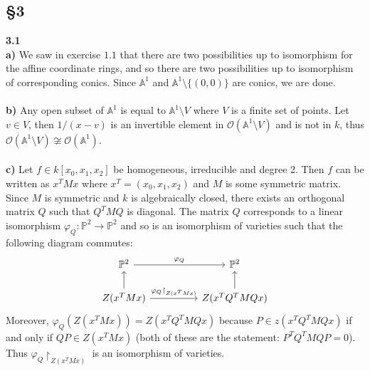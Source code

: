 \documentclass[12pt]{article}
\numberwithin{thm}{subsection}
\numberwithin{defn}{subsection}
\numberwithin{lemma}{subsection}
\numberwithin{example}{subsection}
\numberwithin{notation}{subsection}
\numberwithin{cor}{subsection}
\numberwithin{remark}{subsection}
\numberwithin{condition}{subsection}
\numberwithin{question}{subsection}
\numberwithin{construction}{subsection}
\numberwithin{construction}{subsection}
\numberwithin{construction}{subsection}
\newcommand{\bb}[1]{\mathbb{#1}}
\newcommand{\call}[1]{\mathcal{#1}}
\newcommand{\lto}{\longrightarrow}
\begin{document}
\subsection{\S 3}
\textbf{3.1}\\
\textbf{a)} We saw in exercise $1.1$ that there are two possibilities up to isomorphism for the affine coordinate rings, and so there are two possibilities up to isomorphism of corresponding conics. Since $\bb{A}^1$ and $\bb{A}^1\setminus \lbrace (0,0)\rbrace$ are conics, we are done.\\\\
%
\textbf{b)} Any open subset of $\bb{A}^1$ is equal to $\bb{A}^1\setminus V$ where $V$ is a finite set of points. Let $v \in V$, then $1/(x-v)$ is an invertible element in $\call{O}(\bb{A}^1\setminus V)$ and is not in $k$, thus $\call{O}(\bb{A}^1\setminus V) \not\cong \call{O}(\bb{A}^1)$.\\\\
%
\textbf{c)} Let $f \in k[x_0,x_1,x_2]$ be homogeneous, irreducible and degree 2. Then $f$ can be written as $x^TMx$ where $x^T = (x_0, x_1, x_2)$ and $M$ is some symmetric matrix. Since $M$ is symmetric and $k$ is algebraically closed, there exists an orthogonal matrix $Q$ such that $Q^TMQ$ is diagonal. The matrix $Q$ corresponds to a linear isomorphism $\varphi_Q: \bb{P}^2 \lto \bb{P}^2$ and so is an isomorphism of varieties such that the following diagram commutes:
\[
\begin{tikzcd}[column sep = huge]
\bb{P}^2\arrow[r,"{\varphi_Q}"] & \bb{P}^2\\
Z(x^TMx)\arrow[u]\arrow[r,"{\varphi_Q\restriction_{Z(x^TMx)}}"] & Z(x^TQ^TMQx)\arrow[u]
\end{tikzcd}
\]
Moreover, $\varphi_Q(Z(x^TMx)) = Z(x^TQ^TMQx)$ because $P \in z(x^TQ^TMQx)$ if and only if $QP \in Z(x^TMx)$ (both of these are the statement: $P^TQ^TMQP = 0$). Thus $\varphi_Q\restriction_{Z(x^TMx)}$ is an isomorphism of varieties.
\end{document}
